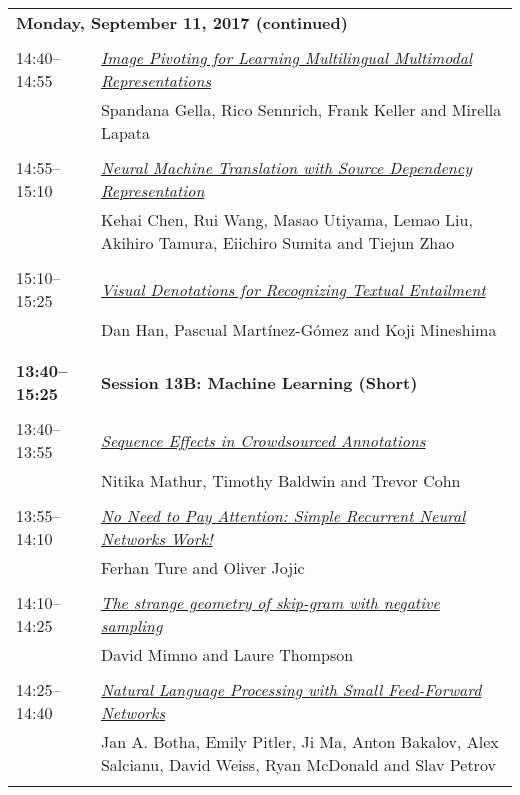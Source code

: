 \begin{tabular}{p{20mm}p{128mm}}
\\
\multicolumn{2}{l}{\bf Monday, September 11, 2017 (continued)} \\\\
14:40--14:55 & \hyperlink{page.2822}{\em Image Pivoting for Learning Multilingual Multimodal Representations}\\
         & Spandana Gella, Rico Sennrich, Frank Keller and Mirella Lapata \\
\\

14:55--15:10 & \hyperlink{page.2829}{\em Neural Machine Translation with Source Dependency Representation}\\
         & Kehai Chen, Rui Wang, Masao Utiyama, Lemao Liu, Akihiro Tamura, Eiichiro Sumita and Tiejun Zhao \\
\\

15:10--15:25 & \hyperlink{page.2836}{\em Visual Denotations for Recognizing Textual Entailment}\\
         & Dan Han, Pascual Mart\'{i}nez-G\'{o}mez and Koji Mineshima \\
\\

\\{\bf 13:40--15:25} & {\bf Session 13B: Machine Learning (Short) } \\
\\
13:40--13:55 & \hyperlink{page.2843}{\em Sequence Effects in Crowdsourced Annotations}\\
         & Nitika Mathur, Timothy Baldwin and Trevor Cohn \\
\\

13:55--14:10 & \hyperlink{page.2849}{\em No Need to Pay Attention: Simple Recurrent Neural Networks Work!}\\
         & Ferhan Ture and Oliver Jojic \\
\\

14:10--14:25 & \hyperlink{page.2856}{\em The strange geometry of skip-gram with negative sampling}\\
         & David Mimno and Laure Thompson \\
\\

14:25--14:40 & \hyperlink{page.2862}{\em Natural Language Processing with Small Feed-Forward Networks}\\
         & Jan A. Botha, Emily Pitler, Ji Ma, Anton Bakalov, Alex Salcianu, David Weiss, Ryan McDonald and Slav Petrov \\
\\


\end{tabular}
